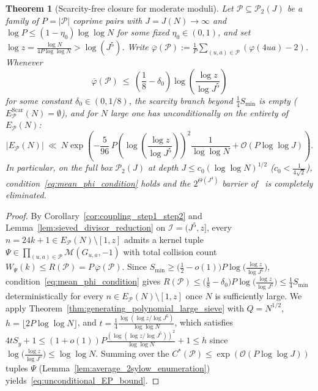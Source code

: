 \documentclass[11pt, a4paper]{article}
\theoremstyle{plain}
\newtheorem{theorem}{Theorem}[section]
\theoremstyle{definition}
\begin{document}
\begin{theorem}[Scarcity-free closure for moderate moduli]\label{thm:unconditional_small_growing_depth}
Let $\mathcal{P}\subseteq\mathcal{P}_2(J)$ be a family of $P=|\mathcal{P}|$ coprime pairs with $J=J(N)\to\infty$ and $\log P\le(1-\eta_0)\log\log N$ for some fixed $\eta_0\in(0,1)$, and set $\log z=\frac{\log N}{4P\log\log N}>\log(J^{5})$. Write $\overline{\varphi}(\mathcal{P}):=\frac1P\sum_{(u,a)\in\mathcal{P}}(\varphi(4ua)-2)$. Whenever
\begin{equation}\label{eq:mean_phi_condition}
\overline{\varphi}(\mathcal{P})\ \le\ \left(\frac18-\delta_0\right)\log\!\left(\frac{\log z}{\log J^{5}}\right)
\end{equation}
for some constant $\delta_0\in(0,1/8)$, the scarcity branch beyond $\frac14 S_{\min}$ is empty ($E_{\mathcal{P}}^{\mathrm{Scar}}(N)=\emptyset$), and for $N$ large one has unconditionally on the entirety of $E_{\mathcal{P}}(N)$:
\begin{equation}\label{eq:unconditional_EP_bound}
|E_{\mathcal{P}}(N)|\ \ll\ N\exp\!\left(-\frac{5}{96}\,P\left(\log\!\left(\frac{\log z}{\log J^{5}}\right)\right)^{2}\frac{1}{\log\log N}+\mathcal{O}(P\log\log J)\right).
\end{equation}
In particular, on the full box $\mathcal{P}_2(J)$ at depth $J\le c_0(\log\log N)^{1/2}$ ($c_0<\frac{1}{4\sqrt{2}}$), condition~\eqref{eq:mean_phi_condition} holds and the $2^{\Theta(J^{4})}$ barrier of~\cite[\S4.1]{dahan2026a} is completely eliminated.
\end{theorem}
\begin{proof}
By Corollary~\ref{cor:coupling_step1_step2} and Lemma~\ref{lem:sieved_divisor_reduction} on $\mathcal{I}=(J^{5},z]$, every $n=24k+1\in E_{\mathcal{P}}(N)\setminus[1,z]$ admits a kernel tuple $\Psi\in\prod_{(u,a)\in\mathcal{P}}\mathcal{M}(G_{u,a},-1)$ with total collision count $W_\Psi(k)\le R(\mathcal{P})=P\,\overline{\varphi}(\mathcal{P})$. Since $S_{\min}\ge\big(\frac12-o(1)\big)P\log\big(\frac{\log z}{\log J^{5}}\big)$, condition~\eqref{eq:mean_phi_condition} gives $R(\mathcal{P})\le\big(\frac18-\delta_0\big)P\log\big(\frac{\log z}{\log J^{5}}\big)\le\frac14 S_{\min}$ deterministically for every $n\in E_{\mathcal{P}}(N)\setminus[1,z]$ once $N$ is sufficiently large. We apply Theorem~\ref{thm:generating_polynomial_large_sieve} with $Q=N^{1/2}$, $h=\lfloor 2P\log\log N\rfloor$, and $t=\frac14\frac{\log(\log z/\log J^{5})}{\log\log N}$, which satisfies $4tS_y+1\le(1+o(1))P\frac{(\log(\log z/\log J^{5}))^{2}}{\log\log N}+1\le h$ since $\log\big(\frac{\log z}{\log J^{5}}\big)\le\log\log N$. Summing over the $C^{\ast}(\mathcal{P})\le\exp(\mathcal{O}(P\log\log J))$ tuples $\Psi$ (Lemma~\ref{lem:average_2sylow_enumeration}) yields~\eqref{eq:unconditional_EP_bound}.
\end{proof}
\end{document}
